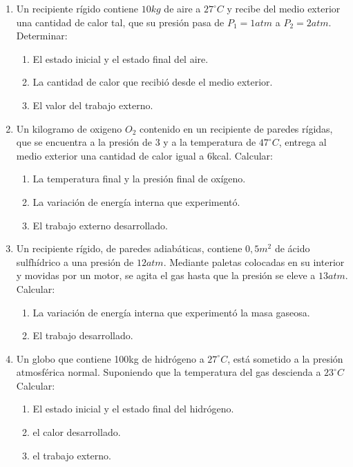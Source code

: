 \documentclass[../main]{subfiles}
\begin{document}
\begin{enumerate}
  \item Un recipiente rígido contiene $10kg$ de aire a $27^\circ C$ y
    recibe del medio exterior una cantidad de calor tal, que su
    presión pasa de $P_1=1 atm$ a $P_2=2 atm$. Determinar:
    \begin{enumerate}
      \item El estado inicial y el estado final del aire.
      \item La cantidad de calor que recibió desde el medio exterior.
      \item El valor del trabajo externo.
    \end{enumerate}
  \item Un kilogramo de oxigeno $O_2$ contenido en un recipiente de
    paredes rígidas, que se encuentra a la presión de \SI{3}{\atm} y a la
    temperatura de $47^\circ C$, entrega al medio exterior una
    cantidad de calor igual a 6kcal. Calcular:
    \begin{enumerate}
      \item La temperatura final y la presión final de oxígeno.
      \item La variación de energía interna que experimentó.
      \item El trabajo externo desarrollado.
    \end{enumerate}
  \item Un recipiente rígido, de paredes adiabáticas, contiene
    $0,5m^2$ de ácido sulfhídrico a una presión de $12 atm$. Mediante
    paletas colocadas en su interior y movidas por un motor, se agita
    el gas hasta que la presión se eleve a $13atm$. Calcular:
    \begin{enumerate}
      \item La variación de energía interna que experimentó la masa gaseosa.
      \item El trabajo desarrollado.
    \end{enumerate}
  \item Un globo que contiene 100kg de hidrógeno a $27^\circ C$, está
    sometido a la presión atmosférica normal. Suponiendo que la
    temperatura del gas descienda a $23^\circ C$ Calcular:
    \begin{enumerate}
      \item El estado inicial y el estado final del hidrógeno.
      \item el calor desarrollado.
      \item el trabajo externo.
    \end{enumerate}

\end{enumerate}
\end{document}
